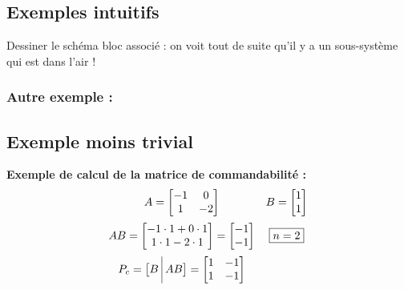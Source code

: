 \documentclass[document.tex]{subfiles}
\begin{document}



\subsection{Exemples intuitifs}


Dessiner le schéma bloc associé : on voit tout de suite qu'il y a un sous-système qui est dans l'air !


\subsubsection{Autre exemple :}


\subsection{Exemple moins trivial}


\textbf{Exemple de calcul de la matrice de commandabilité : }\\
\begin{equation}
\begin{array}{c c}
A = \begin{bmatrix} -1 & 0 \\ 1 & -2 \end{bmatrix} & B = \begin{bmatrix} 1 \\ 1 \end{bmatrix} \\[12pt]
AB = \begin{bmatrix} -1 \cdot 1+0 \cdot 1 \\ 1 \cdot 1 - 2 \cdot 1 \end{bmatrix} = \begin{bmatrix} -1 \\ -1 \end{bmatrix} & \boxed{n=2} \\[12pt]
P_c = \big[ B \; \vline \;  AB \big] = \begin{bmatrix} 1 & -1 \\ 1 & -1 \end{bmatrix}
\end{array}
\end{equation}
\end{document}
